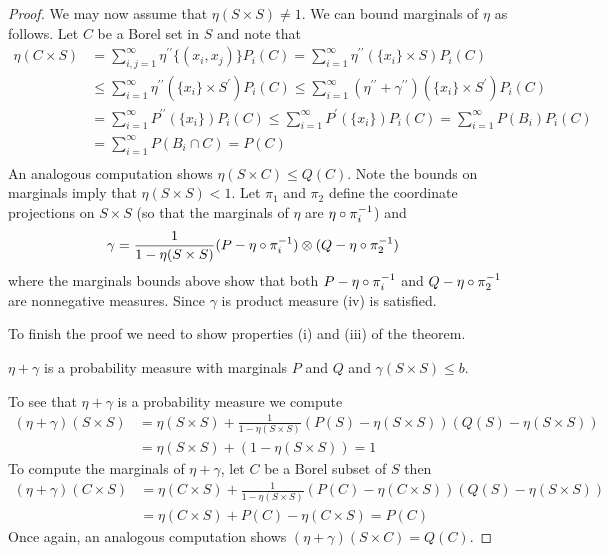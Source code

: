 \begin{proof}
We may now assume that $\eta(S \times S) \neq 1$.  We can bound marginals of $\eta$ as follows. 
Let $C$ be a Borel set in $S$ and note that
\begin{align*}
\eta(C \times S) &= \sum_{i,j = 1}^\infty \eta^{\prime \prime} \lbrace (x_i, x_j) \rbrace P_i (C) 
=  \sum_{i = 1}^\infty \eta^{\prime \prime} (\lbrace x_i \rbrace \times S ) P_i (C) \\
&\leq  \sum_{i = 1}^\infty \eta^{\prime \prime} (\lbrace x_i \rbrace \times S^\prime ) P_i (C) 
\leq \sum_{i = 1}^\infty (\eta^{\prime \prime} + \gamma^{\prime \prime}) (\lbrace x_i \rbrace \times S^\prime ) P_i (C) \\
&= \sum_{i = 1}^\infty P^{\prime \prime} (\lbrace x_i \rbrace) P_i (C) 
\leq \sum_{i = 1}^\infty P^{\prime} (\lbrace x_i \rbrace) P_i (C) 
= \sum_{i = 1}^\infty P (B_i) P_i (C) \\
&= \sum_{i = 1}^\infty P (B_i \cap C) 
= P(C)\\
\end{align*}
An analogous computation shows $\eta(S \times C)  \leq Q(C)$.  Note the bounds on marginals imply that $\eta(S \times S) < 1$.  Let $\pi_1$ and $\pi_2$ define the coordinate projections on $S \times S$ (so that the marginals of $\eta$ are $\eta \circ \pi_i^{-1}$) and 
\begin{align*}
\gamma &= \frac{1}{1 - \eta(S \times S)} (P - \eta \circ \pi_i^{-1}) \otimes (Q - \eta \circ \pi_2^{-1})
\end{align*}
where the marginals bounds above show that both $P - \eta \circ \pi_i^{-1}$ and $Q - \eta \circ \pi_2^{-1}$ are nonnegative measures.  Since $\gamma$ is product measure (iv) is satisfied.

To finish the proof we need to show properties (i) and (iii) of the theorem.
\begin{clm} $\eta + \gamma$ is a probability measure with marginals $P$ and $Q$ and $\gamma(S \times S) \leq b$.
\end{clm}
To see that $\eta + \gamma$ is a probability measure we compute
\begin{align*}
(\eta + \gamma)(S \times S) &= \eta(S \times S) + \frac{1}{1 - \eta(S \times S)} (P(S) - \eta(S \times S)) (Q(S) - \eta(S \times S)) \\
&= \eta(S \times S) + (1 - \eta(S \times S)) = 1
\end{align*}
To compute the marginals of $\eta + \gamma$, let $C$ be a Borel subset of $S$ then
\begin{align*}
(\eta + \gamma)(C \times S) &= \eta(C \times S) + \frac{1}{1 - \eta(S \times S)} (P(C) - \eta(C \times S)) (Q(S) - \eta(S \times S)) \\
&= \eta(C \times S) + P(C) - \eta(C \times S) = P(C)
\end{align*}
Once again, an analogous computation shows $(\eta + \gamma)(S \times C) = Q(C)$.


\end{proof}
